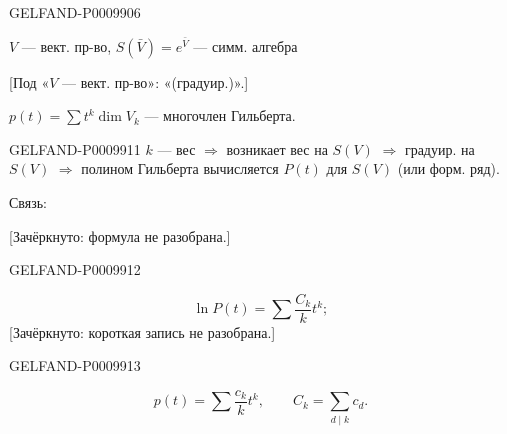\begin{GelfandAdjacentEvidence}{GELFAND-P000990}{6}


$V$ --- вект. пр-во, \qquad $S(\bar V)=e^{\bar V}$ --- симм. алгебра

[Под «$V$ --- вект. пр-во»: «(градуир.)».]

$p(t)=\sum t^k\dim V_k$ --- многочлен Гильберта.
\end{GelfandAdjacentEvidence}



\begin{GelfandAdjacentEvidence}{GELFAND-P000991}{1}
$k$ --- вес $\Rightarrow$ возникает вес на $S(V)$
$\Rightarrow$ градуир. на $S(V)$
$\Rightarrow$ полином Гильберта вычисляется $P(t)$ для $S(V)$
(или форм. ряд).

Связь:

[Зачёркнуто: формула не разобрана.]
\end{GelfandAdjacentEvidence}
\begin{GelfandAdjacentEvidence}{GELFAND-P000991}{2}

\[
\ln P(t)=\sum\frac{C_k}{k}t^k;
\]
[Зачёркнуто: короткая запись не разобрана.]
\end{GelfandAdjacentEvidence}
\begin{GelfandAdjacentEvidence}{GELFAND-P000991}{3}

\[
p(t)=\sum\frac{c_k}{k}t^k,\qquad C_k=\sum_{d\mid k}c_d.
\]
\end{GelfandAdjacentEvidence}
